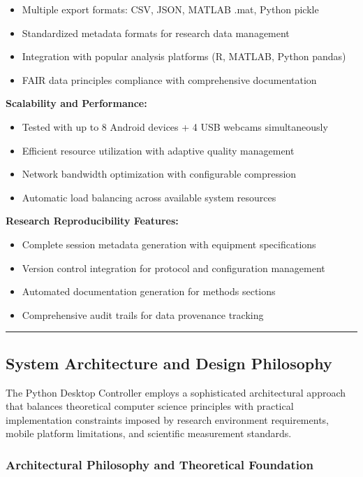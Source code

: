 \documentclass[12pt,a4paper]{article}
\begin{document}
\begin{itemize}
\item Multiple export formats: CSV, JSON, MATLAB .mat, Python pickle
\item Standardized metadata formats for research data management
\item Integration with popular analysis platforms (R, MATLAB, Python pandas)
\item FAIR data principles compliance with comprehensive documentation

\end{itemize}
\textbf{Scalability and Performance:}

\begin{itemize}
\item Tested with up to 8 Android devices + 4 USB webcams simultaneously
\item Efficient resource utilization with adaptive quality management
\item Network bandwidth optimization with configurable compression
\item Automatic load balancing across available system resources

\end{itemize}
\textbf{Research Reproducibility Features:}

\begin{itemize}
\item Complete session metadata generation with equipment specifications
\item Version control integration for protocol and configuration management
\item Automated documentation generation for methods sections
\item Comprehensive audit trails for data provenance tracking

\end{itemize}
\hrule

\subsection{System Architecture and Design Philosophy}

The Python Desktop Controller employs a sophisticated architectural approach that balances theoretical computer science
principles with practical implementation constraints imposed by research environment requirements, mobile platform
limitations, and scientific measurement standards.

\subsubsection{Architectural Philosophy and Theoretical Foundation}
\end{document}
